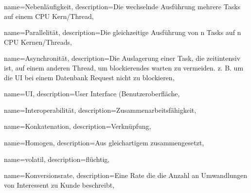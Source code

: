 {name={Nebenläufigkeit},%
 description={Die wechselnde Ausführung mehrere Tasks auf einem CPU Kern/Thread},%
}

{name={Parallelität},%
 description={Die gleichzeitige Ausführung von n Tasks auf n CPU Kernen/Threads},%
}

{name={Asynchronität},%
 description={Die Auslagerung einer Task, die zeitintensiv ist, auf einem anderen Thread, um blockierendes warten zu vermeiden. z. B. um die \gls{UI} bei einem Datenbank Request nicht zu blockieren},%
}

{name={UI},%
 description={User Interface (Benutzeroberfläche},%
}

{name={Interoperabilität},%
 description={Zusammenarbeitsfähigkeit},%
}

{name={Konkatenation},%
 description={Verknüpfung},%
}

{name={Homogen},%
 description={Aus gleichartigem zusammengesetzt},%
}

{name={volatil},%
 description={flüchtig},%
}

{name={Konversionsrate},%
 description={Eine Rate die die Anzahl an Umwandlungen von Interessent zu Kunde beschreibt},%
}
